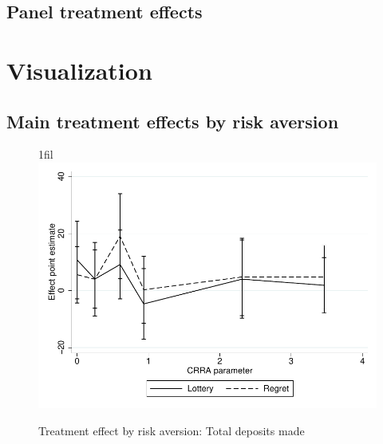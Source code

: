 \documentclass[10pt]{article}
\makeatletter
\newcommand*{\centerfloat}{%
  \parindent \z@
  \leftskip \z@ \@plus 1fil \@minus \textwidth
  \rightskip\leftskip
  \parfillskip \z@skip}
\makeatother
\begin{document}
		
		
		
		
		
		
		
		
		
		
		
		
		
		
		
		
		
		
		
		
		

	\clearpage

	\subsection{Panel treatment effects}

		
		

	\clearpage

\section{Visualization}

	\subsection{Main treatment effects by risk aversion}

		\begin{figure}[!htb]
		\centering
		\caption{Treatment effect by risk aversion: Total deposits made}
		\centerfloat
		\includegraphics{../../figures/line-mobile_totdepositsbyrisk.pdf}
		\end{figure}
\end{document}
